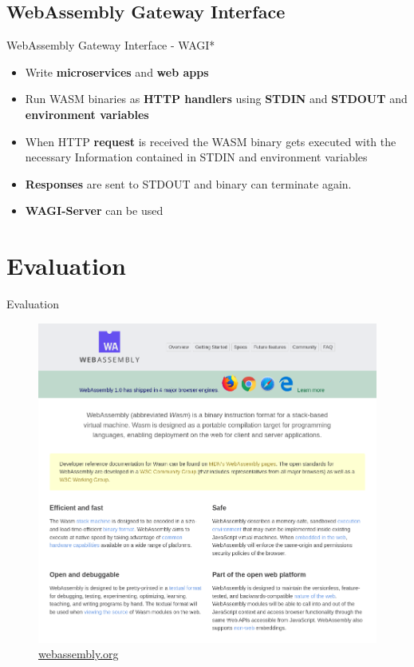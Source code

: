 \documentclass{beamer}
\begin{document}
\subsection{WebAssembly Gateway Interface}
\begin{frame}{WebAssembly Gateway Interface - WAGI*}
    \begin{itemize}
        \item Write \textbf{microservices} and \textbf{web apps}
        \item Run WASM binaries as \textbf{HTTP handlers} using \textbf{STDIN} and \textbf{STDOUT} and \textbf{environment variables}
        \item When HTTP \textbf{request} is received the WASM binary gets executed with the necessary Information contained in STDIN and environment variables
        \item \textbf{Responses} are sent to STDOUT and binary can terminate again.
        \item \textbf{WAGI-Server} can be used
    \end{itemize}
\end{frame}


\section{Evaluation}

\begin{frame}{Evaluation}
    \begin{figure}
        \includegraphics[scale=0.2]{./images/webassembly_org.png}
        \caption{\href{https://webassembly.org/}{webassembly.org}}
    \end{figure}
\end{frame}
\end{document}
